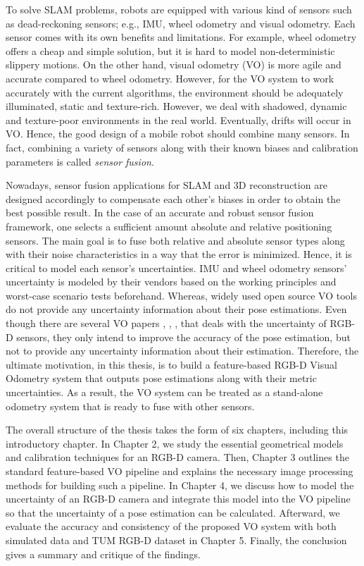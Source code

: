 \documentclass[12pt]{report}
\numberwithin{figure}{section}
\begin{document}
To solve SLAM problems, robots are equipped with various kind of sensors 
such as 
dead-reckoning sensors; e.g., IMU, wheel odometry and visual odometry. 
Each sensor comes with its own benefits and limitations. For example, 
wheel odometry offers a cheap and simple solution, but 
it is hard to model non-deterministic slippery motions. 
On the other hand, visual odometry (VO) is more agile and accurate compared to 
wheel odometry. However, 
for the VO system to work
accurately with the current algorithms, the environment should be adequately 
illuminated, static and
texture-rich.  However, we deal with shadowed, dynamic and
texture-poor environments in the real world. Eventually, drifts will occur in 
VO. 
Hence, the good
design of a mobile robot should combine many sensors.
In fact, combining a variety of sensors 
along with their known biases and calibration parameters is called 
\textit{sensor fusion}.

Nowadays, sensor fusion applications for SLAM and 3D reconstruction are designed 
accordingly to compensate each other's biases in order to obtain the best 
possible result. In the case of an accurate and robust sensor fusion framework, 
one selects a sufficient amount absolute and relative positioning sensors. 
The main goal is to fuse both relative and absolute sensor types 
along with their noise characteristics in a way that the error is minimized. 
Hence, it is critical to model each sensor's uncertainties. 
IMU and wheel odometry sensors' uncertainty is modeled by their vendors 
based on the working principles and worst-case scenario tests beforehand.
Whereas, widely used open source VO tools do not provide any uncertainty information 
about their pose estimations. Even though there are several VO papers 
\parencite{Endres2014}, \parencite{Konolige08}, \parencite{Di2016a}, 
\parencite{Belter2018a}
that deals with the uncertainty of RGB-D sensors, they only intend to 
improve the accuracy of the pose estimation, but not to provide any 
uncertainty 
information about their estimation. Therefore, the ultimate motivation, in 
this thesis, is to build 
a feature-based RGB-D Visual Odometry system that outputs pose estimations 
along with their metric uncertainties.
As a result, the VO system can be treated as a stand-alone 
odometry system that is ready to fuse with other sensors.


The overall structure of the thesis takes the form of six chapters, including
this introductory chapter. In Chapter 2, we study the essential geometrical
models and calibration techniques for an RGB-D camera. Then, Chapter 3 outlines
the standard feature-based VO pipeline and explains the necessary image
processing methods for building such a pipeline. In Chapter 4, we discuss how
to model the uncertainty of an RGB-D camera and integrate this model into the
VO pipeline so that the uncertainty of a pose estimation can be calculated.
Afterward, we evaluate the accuracy and consistency of the proposed VO system
with both simulated data and TUM RGB-D dataset in Chapter 5. Finally, the
conclusion gives a summary and critique of the findings.
\end{document}
